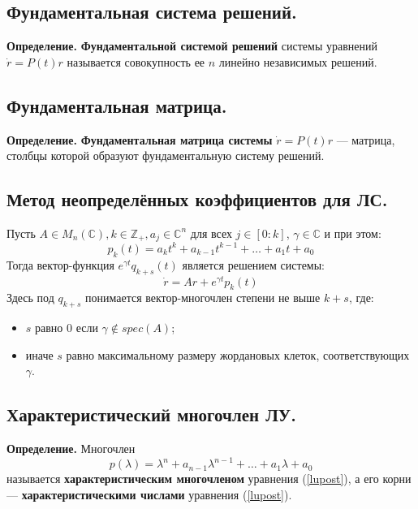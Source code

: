 \documentclass{article}
\begin{document}
\subsection{Фундаментальная система решений.}
\textbf{Определение.} \textbf{Фундаментальной системой решений} системы уравнений $\dot{r} = P(t)r$ называется совокупность ее $n$ линейно независимых решений.

\subsection{Фундаментальная матрица.}
\textbf{Определение.} \textbf{Фундаментальная матрица системы} $\dot{r} = P(t)r$ --- матрица, столбцы которой образуют фундаментальную систему решений.

\subsection{Метод неопределённых коэффициентов для ЛС.}
Пусть $A \in M_n(\mathbb{C}), k \in \mathbb{Z_+}, a_j \in \mathbb{C}^n$ для всех $j\in [0:k]$, $\gamma \in \mathbb{C}$ и при этом:
\begin{equation*}
    p_k(t) = a_kt^k + a_{k-1}t^{k-1} + \ldots + a_1t + a_0
\end{equation*}
Тогда вектор-функция $e^{\gamma t}q_{k+s}(t)$ является решением системы:
\begin{equation*}
    \dot{r} = Ar + e^{\gamma t}p_k(t)
\end{equation*}
Здесь под $q_{k+s}$ понимается вектор-многочлен степени не выше $k+s$, где:
\begin{itemize}
    \item $s$ равно $0$ если $\gamma \notin spec(A)$;
    \item иначе $s$ равно максимальному размеру жордановых клеток, соответствующих $\gamma$.
\end{itemize}

\subsection{Характеристический многочлен ЛУ.}
\textbf{Определение.} Многочлен
\begin{equation*}
    p(\lambda) = \lambda^n + a_{n-1}\lambda^{n-1} + \ldots + a_1\lambda + a_0
\end{equation*}
называется \textbf{характеристическим многочленом} уравнения (\ref{lupost}), а его корни --- \textbf{характеристическими числами} уравнения (\ref{lupost}).\\
\end{document}
